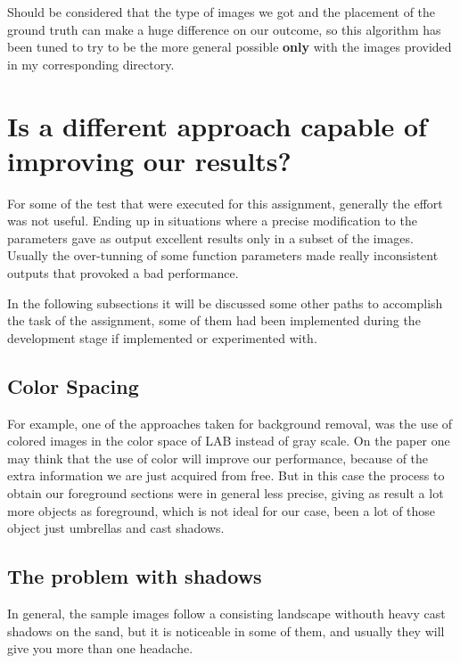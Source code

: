 \documentclass[10pt]{article}
\begin{document}
\FloatBarrier


Should be considered that the type of images we got and the placement of the ground truth can make a huge difference on our outcome, so this algorithm has been tuned to try to be the more general possible \textbf{only} with the images provided in my corresponding directory.

\section{Is a different approach capable of improving our results?}

For some of the test that were executed for this assignment, generally the effort was not useful. Ending up in situations where a precise modification to the parameters gave as output excellent results only in a subset of the images. Usually the over-tunning of some function parameters made really inconsistent outputs that provoked a bad performance.\newline

In the following subsections it will be discussed some other paths to accomplish the task of the assignment, some of them had been implemented during the development stage if implemented or experimented with.

\subsection*{Color Spacing}

For example, one of the approaches taken for background removal, was the use of colored images in the color space of LAB  instead of gray scale. On the paper one may think that the use of color will improve our performance, because of the extra information we are just acquired from free. But in this case the process to obtain our foreground sections were in general less precise, giving as result a lot more objects as foreground, which is not ideal for our case, been a lot of those object just umbrellas and cast shadows.\newline

\subsection*{The problem with shadows}

In general, the sample images follow a consisting landscape withouth heavy cast shadows on the sand, but it is noticeable in some of them, and usually they will give you more than one headache.\newline
\end{document}
